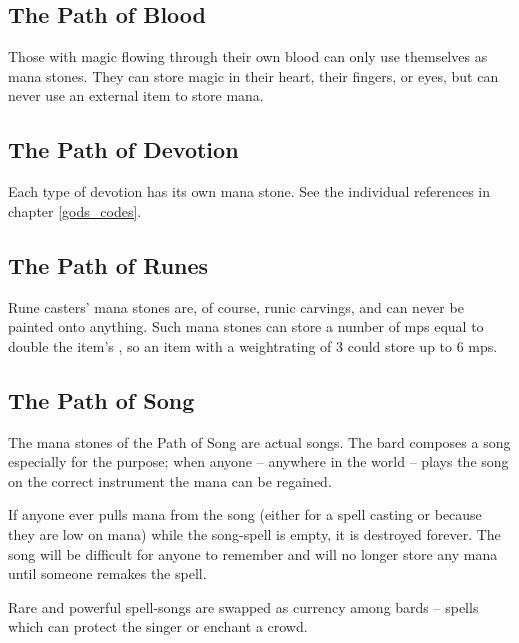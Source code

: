 \begin{multicols}{2}
\subsection{The Path of Blood}


Those with magic flowing through their own blood can only use themselves as mana stones.
They can store magic in their heart, their fingers, or eyes, but can never use an external item to store mana.

\subsection{The Path of Devotion}


Each type of devotion has its own mana stone.
See the individual references in chapter \ref{gods_codes}.

\subsection{The Path of Runes}


Rune casters' mana stones are, of course, runic carvings, and can never be painted onto anything.
Such mana stones can store a number of \glspl{mp} equal to double the item's , so an item with a \gls{weightrating} of 3 could store up to 6 \glspl{mp}.

\subsection{The Path of Song}
\label{song}

The mana stones of the Path of Song are actual songs.
The bard composes a song especially for the purpose; when anyone -- anywhere in the world -- plays the song on the correct instrument the mana can be regained.

If anyone ever pulls mana from the song (either for a spell casting or because they are low on mana) while the song-spell is empty, it is destroyed forever.
The song will be difficult for anyone to remember and will no longer store any mana until someone remakes the spell.

Rare and powerful spell-songs are swapped as currency among bards -- spells which can protect the singer or enchant a crowd.


\end{multicols}

